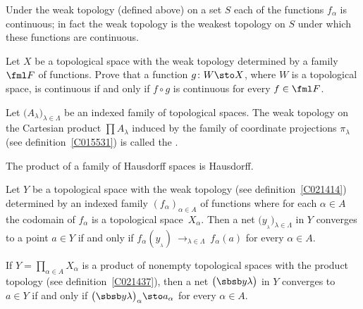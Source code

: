\begin{prop}\label{C021421} Under the weak topology (defined above) on a set $S$ each of the functions $f_\alpha$ is continuous;
in fact the weak topology is  the weakest topology on
$S$ under which these functions are continuous.
\end{prop}

\begin{prop}\label{C021424}  Let $X$ be a topological space with the weak topology determined
by a family $\fml F$ of functions. Prove that a function $g\colon W \sto X$, where $W$ is
a topological space, is continuous if and only if $f \circ g$ is continuous for every $f
\in \fml F$.
\end{prop}

\begin{defn}\label{C021437}  Let $\bigl(A_\lambda\bigr)_{\lambda \in \Lambda}$ be an indexed
family of topological spaces. The weak topology on the Cartesian product $\prod
A_\lambda$ induced by the family of coordinate projections $\pi_\lambda$ (see
definition~\ref{C015531}) is called the
.
\end{defn}

\begin{prop} The product of a family of Hausdorff spaces is Hausdorff.
\end{prop}

\begin{exam}\label{C031473} Let $Y$ be a topological space with the weak topology (see
definition~\ref{C021414}) determined by an indexed family $(f_\alpha)_{\alpha \in A}$ of
functions where for each $\alpha \in A$ the codomain of $f_\alpha$ is a topological
space~$X_\alpha$. Then a net $\bigl(y_{{}_\lambda}\bigr)_{\lambda \in \Lambda}$ in $Y$
converges to a point $a \in Y$ if and only if
\mbox{$f_\alpha(y_{{}_\lambda})~\to_{\lambda \in \Lambda}~f_\alpha(a)$} for every $\alpha
\in A$.
\end{exam}

\begin{exam}\label{C031475} If $Y = \prod_{\alpha \in A} X_\alpha$ is a product of nonempty
topological spaces with the product topology (see definition~\ref{C021437}), then a net
$\bigl(\sbsb y\lambda\bigr)$ in $Y$ converges to $a \in Y$ if and only if $\bigl(\sbsb
y\lambda\bigr)_\alpha \sto a_\alpha$ for every $\alpha \in A$.
\end{exam}

